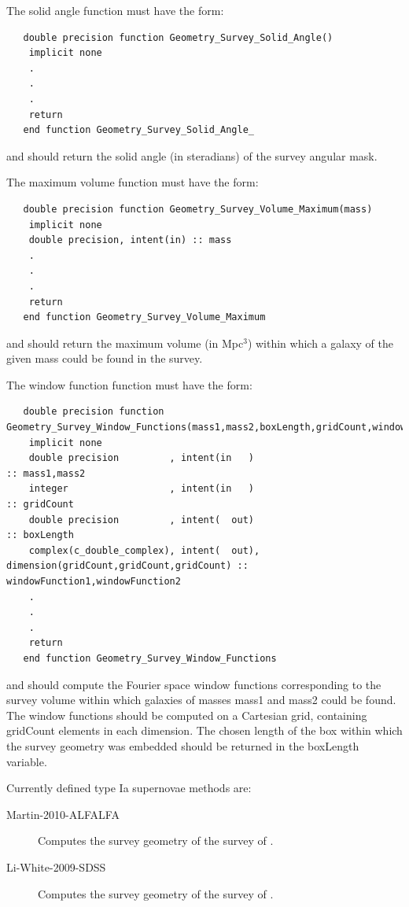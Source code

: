 The solid angle function must have the form:
\begin{verbatim}
   double precision function Geometry_Survey_Solid_Angle()
    implicit none
    .
    .
    .
    return
   end function Geometry_Survey_Solid_Angle_
\end{verbatim}
and should return the solid angle (in steradians) of the survey angular mask.

The maximum volume function must have the form:
\begin{verbatim}
   double precision function Geometry_Survey_Volume_Maximum(mass)
    implicit none
    double precision, intent(in) :: mass
    .
    .
    .
    return
   end function Geometry_Survey_Volume_Maximum 
\end{verbatim}
and should return the maximum volume (in Mpc$^3$) within which a galaxy of the given {\normalfont \ttfamily mass} could be found in the survey.

The window function function must have the form:
\begin{verbatim}
   double precision function Geometry_Survey_Window_Functions(mass1,mass2,boxLength,gridCount,windowFunction1,windowFunction2)
    implicit none
    double precision         , intent(in   )                                           :: mass1,mass2
    integer                  , intent(in   )                                           :: gridCount
    double precision         , intent(  out)                                           :: boxLength
    complex(c_double_complex), intent(  out), dimension(gridCount,gridCount,gridCount) :: windowFunction1,windowFunction2
    .
    .
    .
    return
   end function Geometry_Survey_Window_Functions 
\end{verbatim}
and should compute the Fourier space window functions corresponding to the survey volume within which galaxies of masses {\normalfont \ttfamily mass1} and {\normalfont \ttfamily mass2} could be found. The window functions should be computed on a Cartesian grid, containing {\normalfont \ttfamily gridCount} elements in each dimension. The chosen length of the box within which the survey geometry was embedded should be returned in the {\normalfont \ttfamily boxLength} variable.

Currently defined type Ia supernovae methods are:
\begin{description}
 \item [{\normalfont \ttfamily Martin-2010-ALFALFA}] Computes the survey geometry of the survey of \cite{martin_arecibo_2010}.
 \item [{\normalfont \ttfamily Li-White-2009-SDSS}] Computes the survey geometry of the survey of \cite{li_distribution_2009}.
\end{description}

